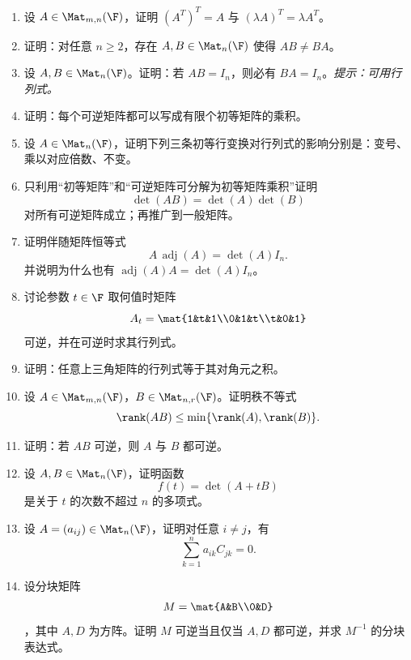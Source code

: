 \begin{enumerate}[label=\arabic*.,start=31]
  \item \medium 设 $A\in\Mat_{m,n}(\F)$，证明 $(A^T)^T=A$ 与 $(\lambda A)^T=\lambda A^T$。

  \item \medium 证明：对任意 $n\ge2$，存在 $A,B\in\Mat_n(\F)$ 使得 $AB\ne BA$。

  \item \medium 设 $A,B\in\Mat_n(\F)$。证明：若 $AB=I_n$，则必有 $BA=I_n$。\emph{提示：可用行列式。}

  \item \medium 证明：每个可逆矩阵都可以写成有限个初等矩阵的乘积。

  \item \medium 设 $A\in\Mat_n(\F)$，证明下列三条初等行变换对行列式的影响分别是：变号、乘以对应倍数、不变。

  \item \medium 只利用“初等矩阵”和“可逆矩阵可分解为初等矩阵乘积”证明
  \[
  \det(AB)=\det(A)\det(B)
  \]
  对所有可逆矩阵成立；再推广到一般矩阵。

  \item \medium 证明伴随矩阵恒等式
  \[
  A\,\operatorname{adj}(A)=\det(A)I_n.
  \]
  并说明为什么也有 $\operatorname{adj}(A)A=\det(A)I_n$。

  \item \medium 讨论参数 $t\in\F$ 取何值时矩阵
  \[
  A_t=\mat{1&t&1\\0&1&t\\t&0&1}
  \]
  可逆，并在可逆时求其行列式。

  \item \medium 证明：任意上三角矩阵的行列式等于其对角元之积。

  \item \medium 设 $A\in\Mat_{m,n}(\F)$，$B\in\Mat_{n,r}(\F)$。证明秩不等式
  \[
  \rank(AB)\le \min\{\rank(A),\rank(B)\}.
  \]

  \item \medium 证明：若 $AB$ 可逆，则 $A$ 与 $B$ 都可逆。

  \item \medium 设 $A,B\in\Mat_n(\F)$，证明函数
  \[
  f(t)=\det(A+tB)
  \]
  是关于 $t$ 的次数不超过 $n$ 的多项式。

  \item \medium 设 $A=(a_{ij})\in\Mat_n(\F)$，证明对任意 $i\ne j$，有
  \[
  \sum_{k=1}^n a_{ik}C_{jk}=0.
  \]

  \item \medium 设分块矩阵
  \[
  M=\mat{A&B\\0&D}
  \]
  ，其中 $A,D$ 为方阵。证明 $M$ 可逆当且仅当 $A,D$ 都可逆，并求 $M^{-1}$ 的分块表达式。


\end{enumerate}

